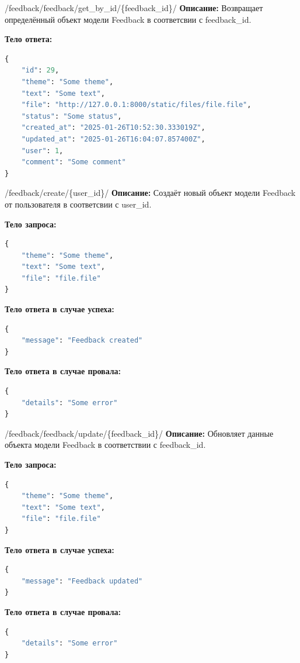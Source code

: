 \documentclass[a4paper,14pt]{extarticle}
\begin{document}
	\begin{getapi}{/feedback/feedback/get\_by\_id/\{feedback\_id\}/}
		\textbf{Описание:} Возвращает определённый объект модели Feedback в соответсвии с feedback\_id.\medskip
		
		\textbf{Тело ответа:}
		\begin{lstlisting}[language=Python]
{
    "id": 29,
    "theme": "Some theme",
    "text": "Some text",
    "file": "http://127.0.0.1:8000/static/files/file.file",
    "status": "Some status",
    "created_at": "2025-01-26T10:52:30.333019Z",
    "updated_at": "2025-01-26T16:04:07.857400Z",
    "user": 1,
    "comment": "Some comment"
}
		\end{lstlisting}
	\end{getapi}
	
	\begin{postapi}{/feedback/create/\{user\_id\}/}
		\textbf{Описание:} Создаёт новый объект модели Feedback от пользователя в соответсвии с user\_id.\medskip
		
		\textbf{Тело запроса:}
		\begin{lstlisting}[language=Python]
{
    "theme": "Some theme",
    "text": "Some text",
    "file": "file.file"
}
		\end{lstlisting}
		
		\textbf{Тело ответа в случае успеха:}
		\begin{lstlisting}[language=Python]
{
    "message": "Feedback created"
}
		\end{lstlisting}
		
		\textbf{Тело ответа в случае провала:}
		\begin{lstlisting}[language=Python]
{
    "details": "Some error"
}
		\end{lstlisting}
	\end{postapi}
	
	\begin{putapi}{/feedback/feedback/update/\{feedback\_id\}/}
		\textbf{Описание:} Обновляет данные объекта модели Feedback в соответствии с feedback\_id.\medskip
		
		\textbf{Тело запроса:}
		\begin{lstlisting}[language=Python]
{
    "theme": "Some theme",
    "text": "Some text",
    "file": "file.file"
}
		\end{lstlisting}
		
		\textbf{Тело ответа в случае успеха:}
		\begin{lstlisting}[language=Python]
{
    "message": "Feedback updated"
}
		\end{lstlisting}
		
		\textbf{Тело ответа в случае провала:}
		\begin{lstlisting}[language=Python]
{
    "details": "Some error"
}
		\end{lstlisting}
	\end{putapi}
	
\end{document}
